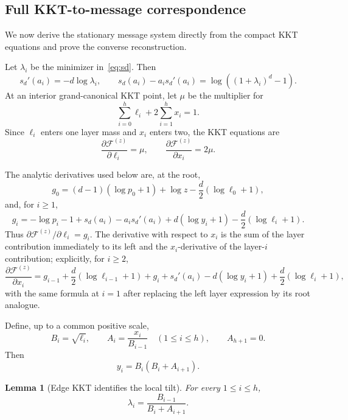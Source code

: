 \documentclass[11pt]{amsart}
\newtheorem{lemma}[theorem]{Lemma}
\theoremstyle{definition}
\newcommand{\Fcal}{\mathcal F}
\begin{document}
\subsection{Full KKT-to-message correspondence}\label{sec:kkt}
We now derive the stationary message system directly from the compact KKT equations and prove the converse reconstruction.

Let $\lambda_i$ be the minimizer in~\eqref{eq:sd}.  Then
\begin{equation}\label{eq:sd-identities}
 s_d'(a_i)=-d\log\lambda_i,
 \qquad
 s_d(a_i)-a_i s_d'(a_i)=\log((1+\lambda_i)^d-1).
\end{equation}
At an interior grand-canonical KKT point, let $\mu$ be the multiplier for
\[
 \sum_{i=0}^h\ell_i+2\sum_{i=1}^h x_i=1.
\]
Since $\ell_i$ enters one layer mass and $x_i$ enters two, the KKT equations are
\begin{equation}\label{eq:kkt-weight}
 \frac{\partial\Fcal^{(z)}}{\partial\ell_i}=\mu,
 \qquad
 \frac{\partial\Fcal^{(z)}}{\partial x_i}=2\mu.
\end{equation}

The analytic derivatives used below are, at the root,
\[
 g_0=(d-1)(\log p_0+1)+\log z-\frac d2(\log\ell_0+1),
\]
and, for $i\ge1$,
\[
 g_i=-\log p_i-1+s_d(a_i)-a_i s_d'(a_i)
 +d(\log y_i+1)-\frac d2(\log\ell_i+1).
\]
Thus $\partial\Fcal^{(z)}/\partial\ell_i=g_i$.  The derivative with respect to $x_i$ is the sum of the layer contribution immediately to its left and the $x_i$-derivative of the layer-$i$ contribution; explicitly, for $i\ge2$,
\[
 \frac{\partial\Fcal^{(z)}}{\partial x_i}
 =g_{i-1}+\frac d2(\log\ell_{i-1}+1)
 +g_i+s_d'(a_i)-d(\log y_i+1)+\frac d2(\log\ell_i+1),
\]
with the same formula at $i=1$ after replacing the left layer expression by its root analogue.

Define, up to a common positive scale,
\begin{equation}\label{eq:belief-messages}
 B_i=\sqrt{\ell_i},
 \qquad
 A_i=\frac{x_i}{B_{i-1}}
 \quad(1\le i\le h),
 \qquad
 A_{h+1}=0.
\end{equation}
Then
\[
 y_i=B_i(B_i+A_{i+1}).
\]

\begin{lemma}[Edge KKT identifies the local tilt]\label{lem:kkt-lambda}
For every $1\le i\le h$,
\begin{equation}\label{eq:lambda-message}
 \lambda_i
 =\frac{B_{i-1}}{B_i+A_{i+1}}.
\end{equation}
\end{lemma}
\end{document}
